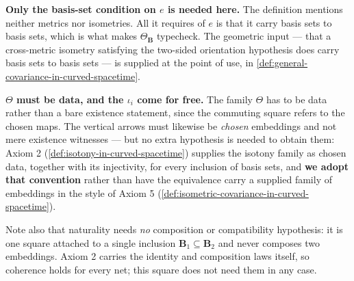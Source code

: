 \begin{definition}
    \textbf{Only the basis-set condition on $e$ is needed here.} The definition mentions neither metrics nor isometries. All it requires of $e$ is that it carry basis sets to basis sets, which is what makes $\Theta_{\mathbf{B}}$ typecheck. The geometric input --- that a cross-metric isometry satisfying the two-sided orientation hypothesis does carry basis sets to basis sets --- is supplied at the point of use, in \ref{def:general-covariance-in-curved-spacetime}.

    \textbf{$\Theta$ must be data, and the $\iota_i$ come for free.} The family $\Theta$ has to be data rather than a bare existence statement, since the commuting square refers to the chosen maps. The vertical arrows must likewise be \emph{chosen} embeddings and not mere existence witnesses --- but no extra hypothesis is needed to obtain them: Axiom 2 (\ref{def:isotony-in-curved-spacetime}) supplies the isotony family as chosen data, together with its injectivity, for every inclusion of basis sets, and \textbf{we adopt that convention} rather than have the equivalence carry a supplied family of embeddings in the style of Axiom 5 (\ref{def:isometric-covariance-in-curved-spacetime}).

    Note also that naturality needs \emph{no} composition or compatibility hypothesis: it is one square attached to a single inclusion $\mathbf{B}_1 \subseteq \mathbf{B}_2$ and never composes two embeddings. Axiom 2 carries the identity and composition laws itself, so coherence holds for every net; this square does not need them in any case.
\end{definition}

